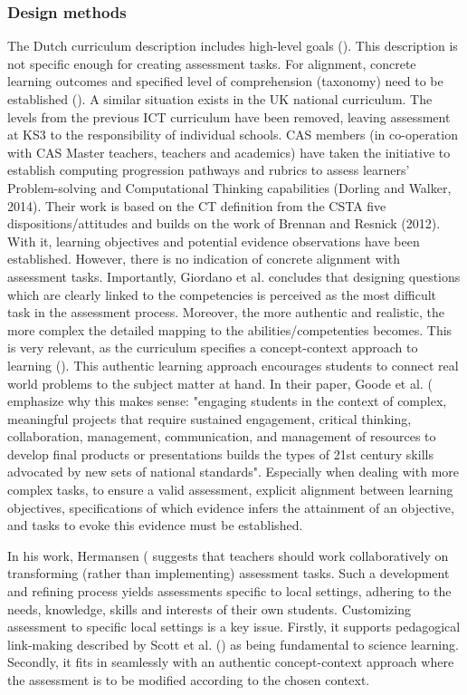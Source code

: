 \subsubsection*{Design methods}
The Dutch curriculum description includes high-level goals (\cite{Barendsen2016}). This description is not specific enough for creating assessment tasks. For alignment, concrete learning outcomes and specified level of comprehension (taxonomy) need to be established (\cite{biggs1996}). A similar situation exists in the UK national curriculum. The levels from the previous ICT curriculum have been removed, leaving assessment at KS3 to the responsibility of individual schools. CAS members (in co-operation with CAS Master teachers, teachers and academics) have taken the initiative to establish computing progression pathways and rubrics to assess learners' Problem-solving and Computational Thinking capabilities (Dorling and Walker, 2014).
Their work is based on the CT definition from the CSTA five dispositions/attitudes and builds on the work of Brennan and Resnick (2012). With it, learning objectives and potential evidence observations have been established. However, there is no indication of concrete alignment with assessment tasks. Importantly, Giordano et al. \cite{Giordano2015} concludes that designing questions which are clearly linked to the competencies is perceived as the most difficult task in the assessment process. Moreover, the more authentic and realistic, the more complex the detailed mapping to the abilities/competenties becomes. This is very relevant, as the curriculum specifies a concept-context approach to learning (\cite{Barendsen2016}). This authentic learning approach encourages students to connect real world problems to the subject matter at hand. In their paper, Goode et al. (\cite{goode2014curriculum} emphasize why this makes sense: "engaging students in the context of complex, meaningful projects that require sustained engagement, critical thinking, collaboration, management, communication, and management of resources to develop final products or presentations builds the types of 21st century skills advocated by new sets of national standards". Especially when dealing with more complex tasks, to ensure a valid assessment, explicit alignment between learning objectives, specifications of which evidence infers the attainment of an objective, and tasks to evoke this evidence must be established.


In his work, Hermansen (\cite{hermansen2014reworking} suggests that teachers should work collaboratively on transforming (rather than implementing) assessment tasks. Such a development and refining process yields assessments specific to local settings, adhering to the needs, knowledge, skills and interests of their own students. Customizing assessment to specific local settings is a key issue. Firstly, it supports pedagogical link-making described by Scott et al. (\cite{scott2011pedagogical}) as being fundamental to science learning. Secondly, it fits in seamlessly with an authentic concept-context approach where the assessment is to be modified according to the chosen context.



